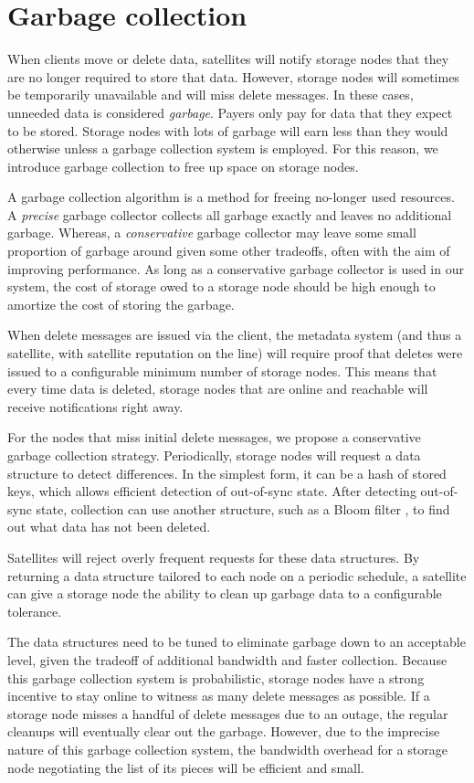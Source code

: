 \documentclass[11pt,fleqn,openany]{book}
\begin{document}
\section{Garbage collection}\label{sec:garbage-collection}

When clients move or delete data, satellites will notify storage nodes
that they are no longer required to store that data. However,
storage nodes will sometimes be temporarily unavailable and will miss delete
messages. In these cases, unneeded data is considered
{\em garbage}. Payers only pay for data that they expect to be stored. Storage
nodes with lots of garbage will earn less than they would
otherwise unless a garbage collection system is employed. For this reason, we
introduce garbage collection to free up space on storage nodes.

A garbage collection algorithm is a method for freeing no-longer used resources.
A {\em precise} garbage collector collects all garbage exactly and
leaves no additional garbage. Whereas, a {\em conservative} garbage collector may
leave some small proportion of garbage around given some other tradeoffs,
often with the aim of improving performance.
As long as a conservative garbage collector is used in our system, the cost of
storage owed to a storage node should be high enough to amortize the cost of
storing the garbage.

When delete messages are issued via the client, the metadata system (and thus a
satellite, with satellite reputation on the line) will require proof that
deletes were issued to a configurable minimum number of storage nodes.
This means that every time
data is deleted, storage nodes that are online and reachable will receive
notifications right away.

For the nodes that miss initial delete messages, we propose a conservative
garbage collection strategy. Periodically, storage nodes will request
a data structure to detect differences. In the simplest form, it can be a hash
of stored keys, which allows efficient detection of out-of-sync state. After
detecting out-of-sync state, collection can use another structure, such as a
Bloom filter \cite{bloom-filter}, to find out what data has not been
deleted.

Satellites will reject overly frequent requests for these data structures.
By returning a data
structure tailored to each node on a periodic schedule, a satellite can give a
storage node the ability to clean up garbage data to a configurable tolerance.

The data structures need to be tuned to eliminate garbage down to an acceptable
level, given the tradeoff of additional bandwidth and faster collection.
Because this garbage collection system is probabilistic, storage nodes have a
strong incentive to stay online to witness as many delete messages as possible.
If a storage node misses a handful of delete messages due to an outage, the
regular cleanups will eventually clear out the garbage.
However, due to the imprecise nature of this garbage collection
system, the
bandwidth overhead for a storage node negotiating the list of its pieces
will be efficient and small.
\end{document}
